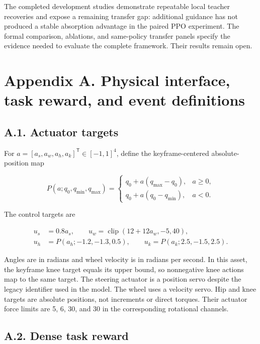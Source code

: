 \documentclass[
  american,
  11pt,
  a4paper,
]{article}
\begin{document}
The completed development studies demonstrate repeatable local teacher
recoveries and expose a remaining transfer gap: additional guidance has
not produced a stable absorption advantage in the paired PPO experiment.
The formal comparison, ablations, and same-policy transfer panels
specify the evidence needed to evaluate the complete framework. Their
results remain open.

\section{Appendix A. Physical interface, task reward, and event
definitions}\label{appendix-a.-physical-interface-task-reward-and-event-definitions}

\subsection{A.1. Actuator targets}\label{a.1.-actuator-targets}

For \(a=[a_s,a_w,a_h,a_k]^{\mathsf T}\in[-1,1]^4\), define the
keyframe-centered absolute-position map

\[
P(a;q_0,q_{\min},q_{\max})=
\begin{cases}
q_0+a(q_{\max}-q_0),&a\ge0,\\
q_0+a(q_0-q_{\min}),&a<0.
\end{cases}
\tag{44}\label{eq:44}
\]

The control targets are

\[
\begin{aligned}
u_s&=0.8a_s,\qquad u_w=\operatorname{clip}(12+12a_w,-5,40),\\
u_h&=P(a_h;-1.2,-1.3,0.5),\qquad
u_k=P(a_k;2.5,-1.5,2.5).
\end{aligned}
\tag{45}\label{eq:45}
\]

Angles are in radians and wheel velocity is in radians per second. In
this asset, the keyframe knee target equals its upper bound, so
nonnegative knee actions map to the same target. The steering actuator
is a position servo despite the legacy identifier used in the model. The
wheel uses a velocity servo. Hip and knee targets are absolute
positions, not increments or direct torques. Their actuator force limits
are 5, 6, 30, and 30 in the corresponding rotational channels.

\subsection{A.2. Dense task reward}\label{a.2.-dense-task-reward}
\end{document}
